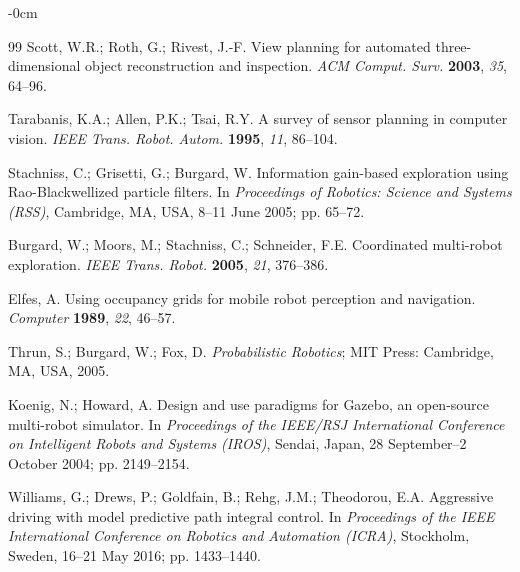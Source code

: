 \documentclass[sensors,article,submit,pdftex,moreauthors]{Definitions/mdpi}
\begin{document}
\begin{adjustwidth}{-\extralength}{0cm}
\begin{thebibliography}{99}
Scott, W.R.; Roth, G.; Rivest, J.-F. View planning for automated three-dimensional object reconstruction and inspection. \textit{ACM Comput. Surv.} \textbf{2003}, \textit{35}, 64--96.

Tarabanis, K.A.; Allen, P.K.; Tsai, R.Y. A survey of sensor planning in computer vision. \textit{IEEE Trans. Robot. Autom.} \textbf{1995}, \textit{11}, 86--104.

Stachniss, C.; Grisetti, G.; Burgard, W. Information gain-based exploration using Rao-Blackwellized particle filters. In \textit{Proceedings of Robotics: Science and Systems (RSS)}, Cambridge, MA, USA, 8--11 June 2005; pp. 65--72.

Burgard, W.; Moors, M.; Stachniss, C.; Schneider, F.E. Coordinated multi-robot exploration. \textit{IEEE Trans. Robot.} \textbf{2005}, \textit{21}, 376--386.

Elfes, A. Using occupancy grids for mobile robot perception and navigation. \textit{Computer} \textbf{1989}, \textit{22}, 46--57.

Thrun, S.; Burgard, W.; Fox, D. \textit{Probabilistic Robotics}; MIT Press: Cambridge, MA, USA, 2005.

Koenig, N.; Howard, A. Design and use paradigms for Gazebo, an open-source multi-robot simulator. In \textit{Proceedings of the IEEE/RSJ International Conference on Intelligent Robots and Systems (IROS)}, Sendai, Japan, 28 September--2 October 2004; pp. 2149--2154.

Williams, G.; Drews, P.; Goldfain, B.; Rehg, J.M.; Theodorou, E.A. Aggressive driving with model predictive path integral control. In \textit{Proceedings of the IEEE International Conference on Robotics and Automation (ICRA)}, Stockholm, Sweden, 16--21 May 2016; pp. 1433--1440.

\end{thebibliography}

%


\end{adjustwidth}
\end{document}
